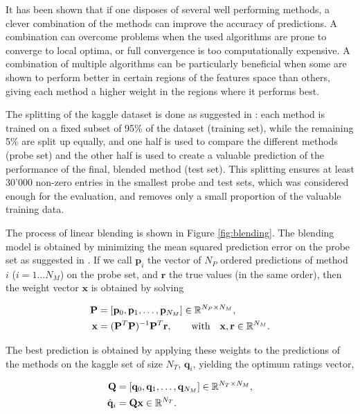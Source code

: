 It has been shown that if one disposes of several well performing methods,
a clever combination of the methods can improve the accuracy of predictions.   
A combination can overcome problems when the used algorithms are prone to
converge to local optima, or full convergence is too computationally expensive.
\cite{Dietterich}
A combination of multiple algorithms can be particularly beneficial when some
are shown to perform better in certain regions of the features space than
others, giving each method a higher weight in the regions where it performs
best.

The splitting of the kaggle dataset is done as suggested in
\cite{Andreas2009}: each method is trained on a fixed subset of 95\% of the
dataset (training set), while the remaining 5\% are split up equally, and one half is used to
compare the different methods (probe set) and the other half is used to create a
valuable prediction of the performance of the final, blended method (test set).  
This splitting ensures at least 30'000 non-zero entries in the smallest probe
and test sets,
which was considered enough for the evaluation, and removes only a small
proportion of the valuable training data.

The process of linear blending is shown in Figure \ref{fig:blending}. 
The blending model is obtained by minimizing the mean squared prediction error
on the probe set as suggested in \cite{Andreas2009}. 
If we call $\mathbf{p}_i$ the vector of $N_P$ ordered predictions of
method $i$ ($i = 1\ldots N_M$) on the
probe set, and $\mathbf{r}$ the true values (in the same order), then the weight vector
$\mathbf{x}$ is obtained by solving 

\begin{align}
  \mathbf{P} &=[\mathbf{p}_0, \mathbf{p}_1, \ldots, \mathbf{p}_{N_M}] \in\mathbb{R}^{N_P\times N_M}, \\
  \mathbf{x} &= (\mathbf{P}^T\mathbf{P})^{-1}\mathbf{P}^T\mathbf{r} ,\hspace{2em} \text{with} \hspace{1em}
  \mathbf{x},\mathbf{r}\in\mathbb{R}^{N_M}.
\end{align}

The best prediction is obtained by applying these weights to the predictions of
the methods on the kaggle set of size $N_T$, $\mathbf{q}_i$, yielding the optimum ratings
vector,

\begin{align}
  \mathbf{Q} &=[\mathbf{q}_0, \mathbf{q}_1, \ldots, \mathbf{q}_{N_M}]
  \in\mathbb{R}^{N_T\times N_M}, \\
  \hat{\mathbf{q}}_i &= \mathbf{Q}\mathbf{x} \in\mathbb{R}^{N_T}.
\end{align}

